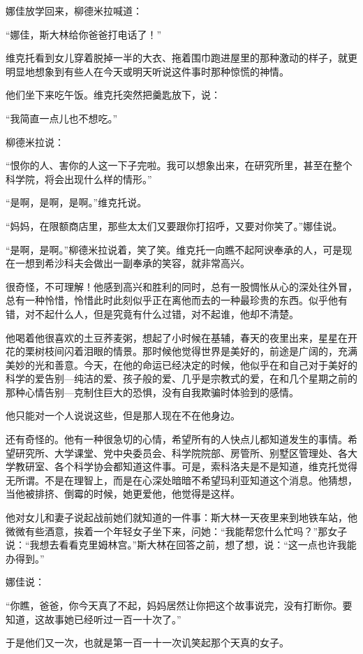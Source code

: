 娜佳放学回来，柳德米拉喊道：

“娜佳，斯大林给你爸爸打电话了！”

维克托看到女儿穿着脱掉一半的大衣、拖着围巾跑进屋里的那种激动的样子，就更明显地想象到有些人在今天或明天听说这件事时那种惊慌的神情。

他们坐下来吃午饭。维克托突然把羹匙放下，说：

“我简直一点儿也不想吃。”

柳德米拉说：

“恨你的人、害你的人这一下子完啦。我可以想象出来，在研究所里，甚至在整个科学院，将会出现什么样的情形。”

“是啊，是啊，是啊。”维克托说。

“妈妈，在限额商店里，那些太太们又要跟你打招呼，又要对你笑了。”娜佳说。

“是啊，是啊。”柳德米拉说着，笑了笑。维克托一向瞧不起阿谀奉承的人，可是现在一想到希沙科夫会做出一副奉承的笑容，就非常高兴。

很奇怪，不可理解！他感到高兴和胜利的同时，总有一股惆怅从心的深处往外冒，总有一种怜惜，怜惜此时此刻似乎正在离他而去的一种最珍贵的东西。似乎他有错，对不起什么人，但是究竟有什么过错，对不起谁，他却不清楚。

他喝着他很喜欢的土豆荞麦粥，想起了小时候在基辅，春天的夜里出来，星星在开花的栗树枝间闪着泪眼的情景。那时候他觉得世界是美好的，前途是广阔的，充满美妙的光和善意。今天，在他的命运已经决定的时候，他似乎在和自己对于美好的科学的爱告别—纯洁的爱、孩子般的爱、几乎是宗教式的爱，在和几个星期之前的那种心情告别—克制住巨大的恐惧，没有自我欺骗时体验到的感情。

他只能对一个人说说这些，但是那人现在不在他身边。

还有奇怪的。他有一种很急切的心情，希望所有的人快点儿都知道发生的事情。希望研究所、大学课堂、党中央委员会、科学院院部、房管所、别墅区管理处、各大学教研室、各个科学协会都知道这件事。可是，索科洛夫是不是知道，维克托觉得无所谓。不是在理智上，而是在心深处暗暗不希望玛利亚知道这个消息。他猜想，当他被排挤、倒霉的时候，她更爱他，他觉得是这样。

他对女儿和妻子说起战前她们就知道的一件事：斯大林一天夜里来到地铁车站，他微微有些酒意，挨着一个年轻女子坐下来，问她：“我能帮您什么忙吗？”那女子说：“我想去看看克里姆林宫。”斯大林在回答之前，想了想，说：“这一点也许我能办得到。”

娜佳说：

“你瞧，爸爸，你今天真了不起，妈妈居然让你把这个故事说完，没有打断你。要知道，这故事她已经听过一百一十次了。”

于是他们又一次，也就是第一百一十一次讥笑起那个天真的女子。

